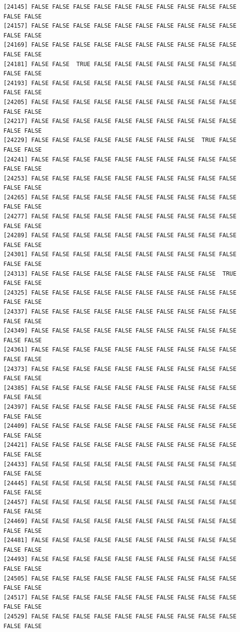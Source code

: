 \documentclass[
  a4paper,
  DIV=11,
  numbers=noendperiod]{scrartcl}
\begin{document}
\begin{verbatim}
[24145] FALSE FALSE FALSE FALSE FALSE FALSE FALSE FALSE FALSE FALSE FALSE FALSE
[24157] FALSE FALSE FALSE FALSE FALSE FALSE FALSE FALSE FALSE FALSE FALSE FALSE
[24169] FALSE FALSE FALSE FALSE FALSE FALSE FALSE FALSE FALSE FALSE FALSE FALSE
[24181] FALSE FALSE  TRUE FALSE FALSE FALSE FALSE FALSE FALSE FALSE FALSE FALSE
[24193] FALSE FALSE FALSE FALSE FALSE FALSE FALSE FALSE FALSE FALSE FALSE FALSE
[24205] FALSE FALSE FALSE FALSE FALSE FALSE FALSE FALSE FALSE FALSE FALSE FALSE
[24217] FALSE FALSE FALSE FALSE FALSE FALSE FALSE FALSE FALSE FALSE FALSE FALSE
[24229] FALSE FALSE FALSE FALSE FALSE FALSE FALSE FALSE  TRUE FALSE FALSE FALSE
[24241] FALSE FALSE FALSE FALSE FALSE FALSE FALSE FALSE FALSE FALSE FALSE FALSE
[24253] FALSE FALSE FALSE FALSE FALSE FALSE FALSE FALSE FALSE FALSE FALSE FALSE
[24265] FALSE FALSE FALSE FALSE FALSE FALSE FALSE FALSE FALSE FALSE FALSE FALSE
[24277] FALSE FALSE FALSE FALSE FALSE FALSE FALSE FALSE FALSE FALSE FALSE FALSE
[24289] FALSE FALSE FALSE FALSE FALSE FALSE FALSE FALSE FALSE FALSE FALSE FALSE
[24301] FALSE FALSE FALSE FALSE FALSE FALSE FALSE FALSE FALSE FALSE FALSE FALSE
[24313] FALSE FALSE FALSE FALSE FALSE FALSE FALSE FALSE FALSE  TRUE FALSE FALSE
[24325] FALSE FALSE FALSE FALSE FALSE FALSE FALSE FALSE FALSE FALSE FALSE FALSE
[24337] FALSE FALSE FALSE FALSE FALSE FALSE FALSE FALSE FALSE FALSE FALSE FALSE
[24349] FALSE FALSE FALSE FALSE FALSE FALSE FALSE FALSE FALSE FALSE FALSE FALSE
[24361] FALSE FALSE FALSE FALSE FALSE FALSE FALSE FALSE FALSE FALSE FALSE FALSE
[24373] FALSE FALSE FALSE FALSE FALSE FALSE FALSE FALSE FALSE FALSE FALSE FALSE
[24385] FALSE FALSE FALSE FALSE FALSE FALSE FALSE FALSE FALSE FALSE FALSE FALSE
[24397] FALSE FALSE FALSE FALSE FALSE FALSE FALSE FALSE FALSE FALSE FALSE FALSE
[24409] FALSE FALSE FALSE FALSE FALSE FALSE FALSE FALSE FALSE FALSE FALSE FALSE
[24421] FALSE FALSE FALSE FALSE FALSE FALSE FALSE FALSE FALSE FALSE FALSE FALSE
[24433] FALSE FALSE FALSE FALSE FALSE FALSE FALSE FALSE FALSE FALSE FALSE FALSE
[24445] FALSE FALSE FALSE FALSE FALSE FALSE FALSE FALSE FALSE FALSE FALSE FALSE
[24457] FALSE FALSE FALSE FALSE FALSE FALSE FALSE FALSE FALSE FALSE FALSE FALSE
[24469] FALSE FALSE FALSE FALSE FALSE FALSE FALSE FALSE FALSE FALSE FALSE FALSE
[24481] FALSE FALSE FALSE FALSE FALSE FALSE FALSE FALSE FALSE FALSE FALSE FALSE
[24493] FALSE FALSE FALSE FALSE FALSE FALSE FALSE FALSE FALSE FALSE FALSE FALSE
[24505] FALSE FALSE FALSE FALSE FALSE FALSE FALSE FALSE FALSE FALSE FALSE FALSE
[24517] FALSE FALSE FALSE FALSE FALSE FALSE FALSE FALSE FALSE FALSE FALSE FALSE
[24529] FALSE FALSE FALSE FALSE FALSE FALSE FALSE FALSE FALSE FALSE FALSE FALSE

\end{verbatim}
\end{document}
